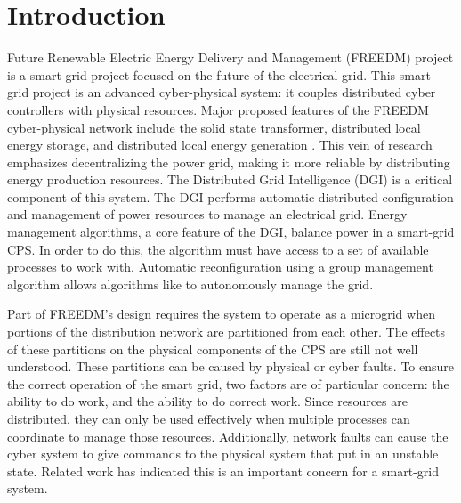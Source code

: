 
\section{Introduction}

 Future Renewable Electric Energy Delivery and Management (FREEDM) project is a smart grid project focused on the future of the electrical grid.
This smart grid project is an advanced cyber-physical system: it couples distributed cyber controllers with physical resources.
Major proposed features of the FREEDM cyber-physical network include the solid state transformer, distributed local energy storage, and distributed local energy generation \cite{FREEDMMIGRATION}.
This vein of research emphasizes decentralizing the power grid, making it more reliable by distributing energy production resources.
The Distributed Grid Intelligence (DGI) is a critical component of this system.
The DGI performs automatic distributed configuration and management of power resources to manage an electrical grid.
Energy management algorithms, a core feature of the DGI\cite{LOADBALANCING}, balance power in a smart-grid CPS.
In order to do this, the algorithm must have access to a set of available processes to work with.
Automatic reconfiguration using a group management algorithm allows algorithms like \cite{LOADBALANCING} to autonomously manage the grid.

Part of FREEDM's design requires the system to operate as a microgrid when portions of the distribution network are partitioned from each other.
The effects of these partitions on the physical components of the CPS are still not well understood.
These partitions can be caused by physical or cyber faults.
To ensure the correct operation of the smart grid, two factors are of particular concern: the ability to do work, and the ability to do correct work.
Since resources are distributed, they can only be used effectively when multiple processes can coordinate to manage those resources.
Additionally, network faults can cause the cyber system to give commands to the physical system that put in an unstable state.
Related work\cite{HARINI}\cite{TSG} has indicated this is an important concern for a smart-grid system.

